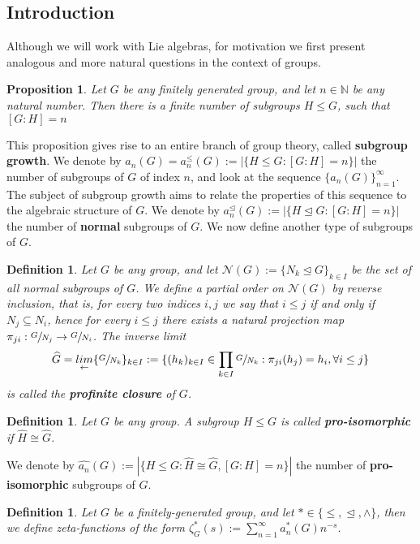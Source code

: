 \documentclass[12pt]{article}
\newtheorem{proposition}[theorem]{Proposition}
\newtheorem{definition}[theorem]{Definition}
\begin{document}
\subsection{Introduction}
Although we will work with Lie algebras, for motivation we first present analogous and more natural questions in the context of groups.
\begin{proposition} \label{prop:finite.number.subgroups}
Let $G$ be any finitely generated group, and let $n\in\mathbb{N}$ be any natural number. Then there is a finite number of subgroups $H\leq G$, such that $[G:H]=n$
\end{proposition}
This proposition gives rise to an entire branch of group theory, called \textbf{subgroup growth}. We denote by $a_{n}(G)=a_{n}^{\leq}(G):=|\{H\leq{G} : [G:H]=n\}|$ the number of subgroups of $G$ of index $n$, and look at the sequence $\{a_n(G)\}_{n=1}^{\infty}$. The subject of subgroup growth aims to relate the properties of this sequence to the algebraic structure of $G$. We denote by $a_{n}^{\trianglelefteq}(G):=|\{H\trianglelefteq{G} : [G:H]=n\}|$ the number of \textbf{normal} subgroups of $G$. We now define another type of subgroups of $G$.
\begin{definition}
\label{def:profinite.closure}
Let $G$ be any group, and let $\mathcal{N}(G):=\{N_k\trianglelefteq G\}_{k\in I}$ be the set of all normal subgroups of $G$. We define a partial order on $\mathcal{N}(G)$ by reverse inclusion, that is, for every two indices $i,j$ we say that $i\leq j$ if and only if $N_j\subseteq N_i$, hence for every $i\leq j$ there exists a natural projection map $\pi_{ji}:\sfrac{G}{N_
j}\rightarrow\sfrac{G}{N_i}$. The inverse limit \[\widehat{G}=\underset{\leftarrow}{lim}\{\sfrac{G}{N_k}\}_{k\in I}:=\{(h_k)_{k\in I}\in\prod_{k\in I}\sfrac{G}{N_k} : \pi_{ji}(h_j)=h_i,\forall i\leq j\}\] is called the \textbf{profinite closure} of $G$.
\end{definition}
\begin{definition}
\label{def:pro.isomorphic}
Let $G$ be any group. A subgroup $H\leq G$ is called \textbf{pro-isomorphic} if $\widehat{H}\cong\widehat{G}$.
\end{definition}
We denote by $\hat{a_n}(G):=|\{H\leq G : \widehat{H}\cong\widehat{G}, [G:H]=n\}|$ the number of \textbf{pro-isomorphic} subgroups of $G$.
\begin{definition}
\label{def:zeta.function}
Let $G$ be a finitely-generated group, and let $\ast\in\{\leq,\trianglelefteq,\wedge\}$, then we define zeta-functions of the form $\zeta_{G}^{\ast}(s):=\sum_{n=1}^{\infty}a_{n}^{\ast}(G){n}^{-s}$. 
\end{definition}
\end{document}
